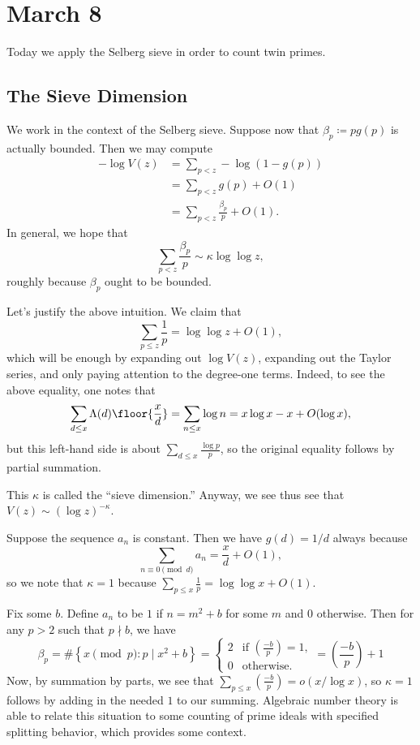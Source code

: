 \documentclass[../notes.tex]{subfiles}
\begin{document}
\section{March 8}

Today we apply the Selberg sieve in order to count twin primes.

\subsection{The Sieve Dimension}
We work in the context of the Selberg sieve. Suppose now that $\beta_p\coloneqq pg(p)$ is actually bounded. Then we may compute
\begin{align*}
	-\log V(z) &= \sum_{p<z}-\log(1-g(p)) \\
	&= \sum_{p<z}g(p)+O(1) \\
	&= \sum_{p<z}\frac{\beta_p}p+O(1).
\end{align*}
In general, we hope that
\[\sum_{p<z}\frac{\beta_p}p\sim\kappa\log\log z,\]
roughly because $\beta_p$ ought to be bounded.
\begin{remark}
	Let's justify the above intuition. We claim that
	\[\sum_{p\le z}\frac1p=\log\log z+O(1),\]
	which will be enough by expanding out $\log V(z)$, expanding out the Taylor series, and only paying attention to the degree-one terms. Indeed, to see the above equality, one notes that
	\[\sum_{d\le x}\Lambda(d)\floor{\frac xd}=\sum_{n\le x}\log n=x\log x-x+O(\log x),\]
	but this left-hand side is about $\sum_{d\le x}\frac{\log p}p$, so the original equality follows by partial summation.
\end{remark}
This $\kappa$ is called the ``sieve dimension.'' Anyway, we see thus see that $V(z)\sim(\log z)^{-\kappa}$.
\begin{example}
	Suppose the sequence $a_n$ is constant. Then we have $g(d)=1/d$ always because
	\[\sum_{n\equiv0\pmod d}a_n=\frac xd+O(1),\]
	so we note that $\kappa=1$ because $\sum_{p\le x}\frac1p=\log\log x+O(1)$.
\end{example}
\begin{example}
	Fix some $b$. Define $a_n$ to be $1$ if $n=m^2+b$ for some $m$ and $0$ otherwise. Then for any $p>2$ such that $p\nmid b$, we have
	\[\beta_p=\#\left\{x\pmod p:p\mid x^2+b\right\}=\begin{cases}
		2 & \text{if }\left(\frac{-b}p\right)=1, \\
		0 & \text{otherwise}.
	\end{cases}=\left(\frac{-b}p\right)+1\]
	Now, by summation by parts, we see that $\sum_{p\le x}\left(\frac{-b}p\right)=o(x/\log x)$, so $\kappa=1$ follows by adding in the needed $1$ to our summing. Algebraic number theory is able to relate this situation to some counting of prime ideals with specified splitting behavior, which provides some context.
\end{example}
\end{document}
